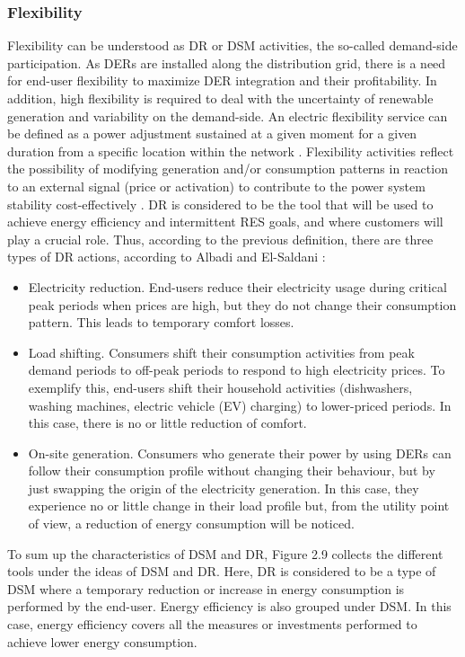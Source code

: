 \subsubsection{Flexibility}
Flexibility can be understood as DR or DSM activities, the so-called demand-side participation. As DERs are installed along the distribution grid, there is a need for end-user flexibility to maximize DER integration and their profitability. In addition, high flexibility is required to deal with the uncertainty of renewable generation and variability on the demand-side. An electric flexibility service can be defined as a power adjustment sustained at a given moment for a given duration from a specific location within the network \cite{Lee2015}. Flexibility activities reflect the possibility of modifying generation and/or consumption patterns in reaction to an external signal (price or activation) to contribute to the power system stability cost-effectively \cite{VILLAR2018Flexibility}. DR is considered to be the tool that will be used to achieve energy efficiency and intermittent RES goals, and where customers will 
play a crucial role. Thus, according to the previous definition, there are three types of DR actions, according to Albadi and El-Saldani \cite{albadi2008summary}:

\begin{itemize}
\item Electricity reduction. End-users reduce their electricity usage during critical peak periods when prices are
high, but they do not change their consumption pattern. This leads to temporary comfort losses. 
\item Load shifting. Consumers shift their consumption activities from peak demand periods to off-peak periods to respond to high electricity prices. To exemplify this, end-users shift their household activities (dishwashers, washing machines, electric vehicle (EV) charging) to lower-priced periods. In this case, there is no or little reduction of comfort. 
\item On-site generation. Consumers who generate their power by using DERs can follow their consumption profile without changing their behaviour, but by just swapping the origin of the electricity generation. In this case, they experience no or little change in their load profile but, from the utility point of view, a reduction of energy consumption will be noticed.
\end{itemize}

To sum up the characteristics of DSM and DR, Figure 2.9 collects the different tools under the ideas of DSM and DR. Here, DR is considered to be a type of DSM where a temporary reduction or increase in energy consumption is performed by the end-user. Energy efficiency is also grouped under DSM. In this case, energy efficiency covers all the measures or investments performed to achieve lower energy consumption.

